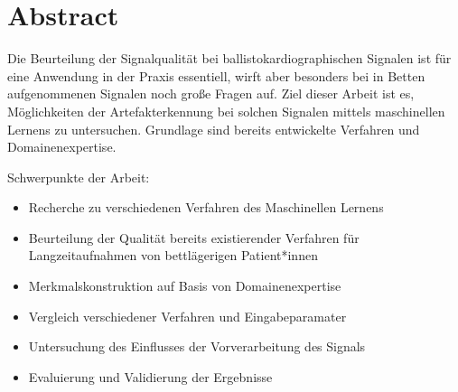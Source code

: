 \clearpage
\chapter*{Abstract}\label{abstract}

Die Beurteilung der Signalqualität bei ballistokardiographischen Signalen ist für eine Anwendung in der Praxis essentiell, wirft aber besonders bei in Betten aufgenommenen Signalen noch große Fragen auf. Ziel dieser Arbeit ist es, Möglichkeiten der Artefakterkennung bei solchen Signalen mittels maschinellen Lernens zu untersuchen. Grundlage sind bereits entwickelte Verfahren und Domainenexpertise. 

Schwerpunkte der Arbeit:
\begin{itemize}
	\item Recherche zu verschiedenen Verfahren des Maschinellen Lernens
	\item Beurteilung der Qualität bereits existierender Verfahren für Langzeitaufnahmen von bettlägerigen Patient*innen
	\item Merkmalskonstruktion auf Basis von Domainenexpertise
	\item Vergleich verschiedener Verfahren und Eingabeparamater
	\item Untersuchung des Einflusses der Vorverarbeitung des Signals
	\item Evaluierung und Validierung der Ergebnisse
\end{itemize}
